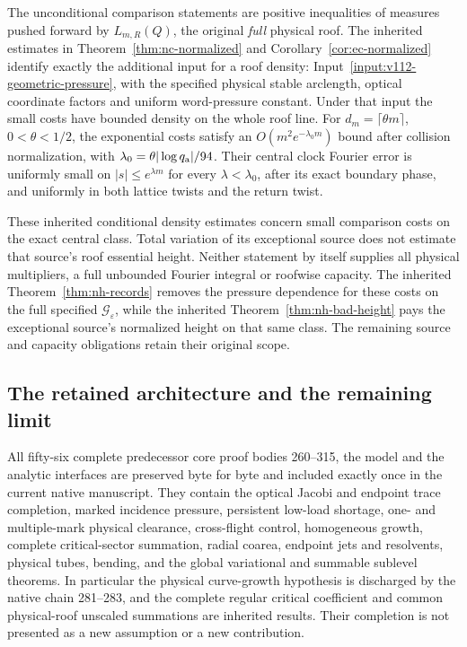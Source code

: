 \documentclass[11pt,reqno]{amsart}
\numberwithin{equation}{section}
\theoremstyle{definition}\newtheorem{definition}[theorem]{Definition}
\theoremstyle{remark}\newtheorem{remark}[theorem]{Remark}
\begin{document}
The unconditional comparison statements are positive inequalities
of measures pushed forward by $L_{m,R}(Q)$, the original
\emph{full} physical roof.  The inherited estimates in
Theorem~\ref{thm:nc-normalized} and
Corollary~\ref{cor:ec-normalized} identify exactly the additional
input for a roof density: Input~\ref{input:v112-geometric-pressure},
with the specified physical stable arclength, optical coordinate
factors and uniform word-pressure constant.  Under that input the
small costs have bounded density on the whole roof line.  For
$d_m=\lceil\theta m\rceil$, $0<\theta<1/2$, the exponential
costs satisfy an $O(m^2e^{-\lambda_0m})$ bound after collision
normalization, with
$\lambda_0=\theta|\log q_{\rm a}|/94$.
Their central clock Fourier error is uniformly small on
$|s|\le e^{\lambda m}$ for every $\lambda<\lambda_0$, after its
exact boundary phase, and uniformly in both lattice twists and
the return twist.

These inherited conditional density estimates concern small comparison
costs on the exact central class.  Total variation of its
exceptional source does not estimate that source's roof essential
height.  Neither statement by itself supplies all physical
multipliers, a full unbounded Fourier integral or roofwise capacity.
The inherited Theorem~\ref{thm:nh-records} removes the pressure dependence
for these costs on the full specified $\mathcal G_\varepsilon$,
while the inherited Theorem~\ref{thm:nh-bad-height} pays the exceptional
source's normalized height on that same class.  The remaining
source and capacity obligations retain their original scope.

\subsection*{The retained architecture and the remaining limit}
All fifty-six complete predecessor core proof bodies 260--315,
the model and the analytic interfaces are preserved byte for byte
and included exactly once in the current native manuscript.
They contain the optical Jacobi and endpoint trace completion,
marked incidence pressure, persistent low-load shortage, one- and
multiple-mark physical clearance, cross-flight control, homogeneous
growth, complete critical-sector summation, radial coarea,
endpoint jets and resolvents, physical tubes, bending, and the
global variational and summable sublevel theorems.  In particular
the physical curve-growth hypothesis is discharged by the native
chain 281--283, and the complete regular critical coefficient
and common physical-roof unscaled summations are inherited results.
Their completion is not presented as a new assumption or a new
contribution.
\end{document}

